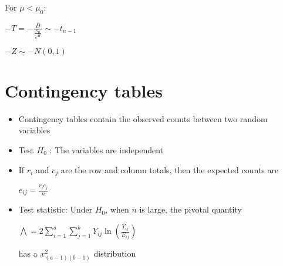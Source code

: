     For $\mu < \mu_0$:
    \begin{center}$ -T = -\frac{\bar{D}}{\frac{S_D}{\sqrt{n}}} \sim -t_{n-1} $\end{center}
    \begin{center}$ -Z \sim -N(0, 1) $\end{center}


  \section{Contingency tables}
    \begin{itemize}
      \item Contingency tables contain the observed counts between two random variables
      \item Test $H_0$ : The variables are independent
      \item If $r_i$ and $c_j$ are the row and column totals, then the expected counts are
        \begin{center}$e_{ij} = \frac{r_ic_j}{n}$\end{center}
      \item Test statistic: Under $H_0$, when $n$ is large, the pivotal quantity
        \begin{center}$\bigwedge = 2 \sum_{i=1}^a \sum_{j=1}^{b} Y_{ij} \ln{(\frac{Y_{ij}}{E_{ij}})}$\end{center}
          has a $x^2_{(a-1)(b-1)}$ distribution
    \end{itemize}

